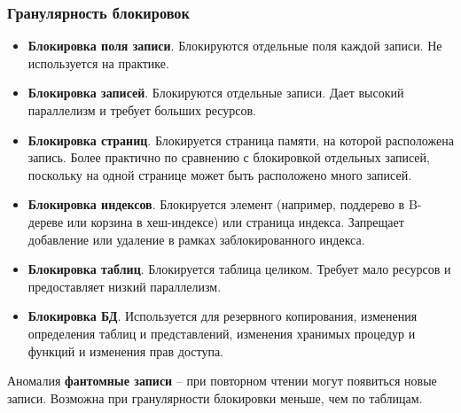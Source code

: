 \subsubsection{Гранулярность блокировок}

\begin{itemize}
	\item \textbf{Блокировка поля записи}. Блокируются отдельные поля каждой записи. Не
	      используется на практике.
	\item \textbf{Блокировка записей}. Блокируются отдельные записи. Дает высокий параллелизм и
	      требует больших ресурсов.
	\item \textbf{Блокировка страниц}. Блокируется страница памяти, на которой расположена запись.
	      Более практично по сравнению с блокировкой отдельных записей, поскольку на одной странице может
	      быть расположено много записей.
	\item \textbf{Блокировка индексов}. Блокируется элемент (например, поддерево в B-дереве или
	      корзина в хеш-индексе) или страница индекса. Запрещает добавление или удаление в рамках
	      заблокированного индекса.
	\item \textbf{Блокировка таблиц}. Блокируется таблица целиком. Требует мало ресурсов и
	      предоставляет низкий параллелизм.
	\item \textbf{Блокировка БД}. Используется для резервного копирования, изменения определения
	      таблиц и представлений, изменения хранимых процедур и функций и изменения прав доступа.
\end{itemize}

Аномалия \textbf{фантомные записи} -- при повторном чтении могут появиться новые записи. Возможна при
гранулярности блокировки меньше, чем по таблицам.
